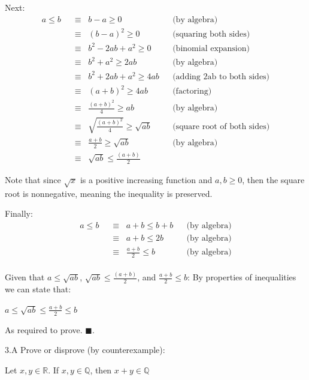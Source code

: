 \documentclass[]{article}
\begin{document}
Next:
\begin{align*}
    a \le b
    &\;\;\equiv\;\; b - a \ge 0
    && \text{(by algebra)} \\[6pt]
    &\;\;\equiv\;\; (b-a)^2 \ge 0
    && \text{(squaring both sides)} \\[6pt]
    &\;\;\equiv\;\; b^2 - 2ab + a^2 \ge 0 
    && \text{(binomial expansion)} \\[6pt]
    &\;\;\equiv\;\; b^2 + a^2 \ge 2ab 
    && \text{(by algebra)} \\[6pt]
    &\;\;\equiv\;\; b^2 + 2ab + a^2 \ge 4ab 
    && \text{(adding 2ab to both sides)} \\[6pt]
    &\;\;\equiv\;\; (a + b)^2 \ge 4ab 
    && \text{(factoring)} \\[6pt]
    &\;\;\equiv\;\; \frac{(a + b)^2}{4} \ge ab 
    && \text{(by algebra)} \\[6pt]
    &\;\;\equiv\;\; \sqrt{\frac{(a + b)^2}{4}} \ge \sqrt{ab}
    && \text{(square root of both sides)} \\[6pt]
    &\;\;\equiv\;\; \frac{a+b}{2} \ge \sqrt{ab}
    && \text{(by algebra)} \\[6pt]
    &\;\;\equiv\;\; \sqrt{ab} \le \frac{(a+b)}{2}
\end{align*}

Note that since $\sqrt{x}$ is a positive increasing function and $a, b \ge 0$, then the square root is nonnegative, meaning the inequality is preserved.

\medskip

Finally:
\begin{align*}
    a\le  b
    &\;\;\equiv\;\; a + b \le b + b
    && \text{(by algebra)} \\[6pt]
    &\;\;\equiv\;\; a + b \le 2b
    && \text{(by algebra)} \\[6pt]
    &\;\;\equiv\;\; \frac{a+b}{2} \le b
    && \text{(by algebra)} \\[6pt]
\end{align*}

Given that $a \le \sqrt{ab}$, $\sqrt{ab} \le \frac{(a+b)}{2}$, and $\frac{a+b}{2} \le b$: By properties of inequalities we can state that:

\begin{center}
    $a \le \sqrt{ab} \le \frac{a+b}{2} \le b$
\end{center}

As required to prove. $\blacksquare$.

\begin{question}{3.A}
    Prove or disprove (by counterexample):
        \begin{center}
            Let $x, y \in \mathbb{R}$. If $x, y \in \mathbb{Q}$, then $x+y \in \mathbb{Q}$
        \end{center}
\end{question}
\end{document}
